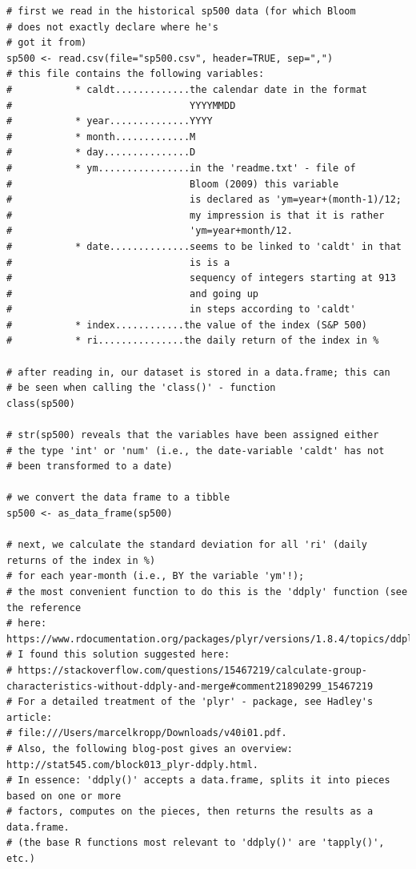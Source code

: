 \documentclass[a4paper,12pt,oneside,pointednumbers,bibtotoc,bigheadings,liststotoc]{scrbook}
\begin{document}
\begin{verbatim}
# first we read in the historical sp500 data (for which Bloom
# does not exactly declare where he's
# got it from)
sp500 <- read.csv(file="sp500.csv", header=TRUE, sep=",")
# this file contains the following variables:
#           * caldt.............the calendar date in the format
#                               YYYYMMDD
#           * year..............YYYY
#           * month.............M
#           * day...............D
#           * ym................in the 'readme.txt' - file of 
#                               Bloom (2009) this variable
#                               is declared as 'ym=year+(month-1)/12;
#                               my impression is that it is rather 
#                               'ym=year+month/12.
#           * date..............seems to be linked to 'caldt' in that
#                               is is a
#                               sequency of integers starting at 913
#                               and going up
#                               in steps according to 'caldt'
#           * index............the value of the index (S&P 500)
#           * ri...............the daily return of the index in %

# after reading in, our dataset is stored in a data.frame; this can
# be seen when calling the 'class()' - function
class(sp500)

# str(sp500) reveals that the variables have been assigned either 
# the type 'int' or 'num' (i.e., the date-variable 'caldt' has not 
# been transformed to a date)

# we convert the data frame to a tibble
sp500 <- as_data_frame(sp500)

# next, we calculate the standard deviation for all 'ri' (daily returns of the index in %)
# for each year-month (i.e., BY the variable 'ym'!);
# the most convenient function to do this is the 'ddply' function (see the reference
# here: https://www.rdocumentation.org/packages/plyr/versions/1.8.4/topics/ddply);
# I found this solution suggested here: 
# https://stackoverflow.com/questions/15467219/calculate-group-characteristics-without-ddply-and-merge#comment21890299_15467219
# For a detailed treatment of the 'plyr' - package, see Hadley's article: 
# file:///Users/marcelkropp/Downloads/v40i01.pdf.
# Also, the following blog-post gives an overview: http://stat545.com/block013_plyr-ddply.html.
# In essence: 'ddply()' accepts a data.frame, splits it into pieces based on one or more
# factors, computes on the pieces, then returns the results as a data.frame.
# (the base R functions most relevant to 'ddply()' are 'tapply()', etc.)


\end{verbatim}
\end{document}
